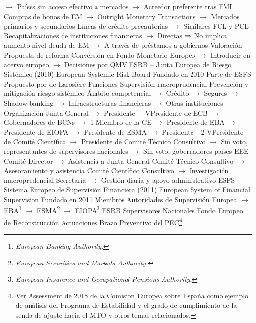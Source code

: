\documentclass{nuevotema}
\begin{document}
\begin{esquemal}
				\4[] $\to$ Países sin acceso efectivo a mercados
				\4[] $\to$ Acreedor preferente tras FMI
				\4[] Compras de bonos de EM
				\4[] $\to$ Outright Monetary Transactions
				\4[] $\to$ Mercados primarios y secundarios
				\4[] Líneas de crédito precautorias
				\4[] $\to$ Similares FCL y PCL
				\4[] Recapitalizaciones de instituciones financieras
				\4[] $\to$ Directas
				\4[] $\Rightarrow$ No implica aumento nivel deuda de EM
				\4[] $\to$ A través de préstamos a gobiernos
				\4 Valoración
				\4[] Propuesta de reforma
				\4[] Conversión en Fondo Monetario Europeo
				\4[] $\to$ Introducir en acervo europeo
				\4[] $\to$ Decisiones por QMV
			\3 ESRB -- Junta Europea de Riesgo Sistémico (2010)
				\4 European Systemic Risk Board
				\4 Fundado en 2010
				\4[] Parte de ESFS
				\4[] Propuesto por de Larosière
				\4 Funciones
				\4[] Supervisión macroprudencial
				\4[] Prevención y mitigación riesgo sistémico
				\4[] Ámbito competencial
				\4[] $\to$ Crédito
				\4[] $\to$ Seguros
				\4[] $\to$ Shadow banking
				\4[] $\to$ Infraestructuras financieras
				\4[] $\to$ Otras instituciones
				\4 Organización
				\4[] Junta General
				\4[] $\to$ Presidente + VPresidente de ECB
				\4[] $\to$ Gobernadores de BCNs
				\4[] $\to$ 1 Miembro de la CE
				\4[] $\to$ Presidente de EBA
				\4[] $\to$ Presidente de EIOPA
				\4[] $\to$ Presidente de ESMA
				\4[] $\to$ Presidente+ 2 VPresidente de Comité Científico
				\4[] $\to$ Presidente de Comité Técnico Consultivo
				\4[] $\to$ Sin voto, representantes de supervisores nacionales
				\4[] $\to$ Sin voto, gobernadores países EEE
				\4[] Comité Director
				\4[] $\to$ Asistencia a Junta General
				\4[] Comité Técnico Consultivo
				\4[] $\to$ Asesoramiento y asistencia
				\4[] Comité Científico Consultivo
				\4[] $\to$ Investigación macroprudencial
				\4[] Secretaría
				\4[] $\to$ Gestión diaria y apoyo administrativo
			\3 ESFS -- Sistema Europeo de Supervisión Financiera (2011)
				\4 European System of Financial Supervision
				\4 Fundado en 2011
				\4 Miembros
				\4[] Autoridades de Supervisión Europea
				\4[] $\to$ EBA\footnote{\textit{European Banking Authority}.}
				\4[] $\to$ ESMA\footnote{\textit{European Securities and Markets Authority}.}
				\4[] $\to$ EIOPA\footnote{\textit{European Insurance and Occupational Pensions Authority}.}
				\4[] ESRB
				\4[] Supervisores Nacionales
			\3 Fondo Europeo de Reconstrucción
		\2 Actuaciones
			\3 Brazo Preventivo del PEC\footnote{Ver Assessment de 2018 de la Comisión Europea sobre España como ejemplo de análisis del Programa de Estabilidad y el grado de cumplimiento de la senda de ajuste hacia el MTO y otros temas relacionados.}

\end{esquemal}
\end{document}
